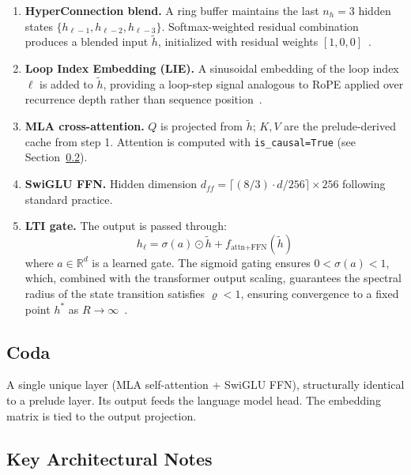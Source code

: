 \documentclass{article}
\begin{document}
\begin{enumerate}[leftmargin=*, topsep=2pt, itemsep=1pt]
  \item \textbf{HyperConnection blend.} A ring buffer maintains the last $n_h = 3$ hidden states $\{h_{\ell-1}, h_{\ell-2}, h_{\ell-3}\}$. Softmax-weighted residual combination produces a blended input $\tilde{h}$, initialized with residual weights $[1, 0, 0]$~\citep{zhang2024hyperconnections}.

  \item \textbf{Loop Index Embedding (LIE).} A sinusoidal embedding of the loop index $\ell$ is added to $\tilde{h}$, providing a loop-step signal analogous to RoPE applied over recurrence depth rather than sequence position~\citep{su2024roformer,gomez2026openmythos}.

  \item \textbf{MLA cross-attention.} $Q$ is projected from $\tilde{h}$; $K, V$ are the prelude-derived cache from step 1. Attention is computed with \texttt{is\_causal=True} (see Section~\ref{sec:arch_notes}).

  \item \textbf{SwiGLU FFN.} Hidden dimension $d_{ff} = \lceil (8/3) \cdot d / 256 \rceil \times 256$ following standard practice.

  \item \textbf{LTI gate.} The output is passed through:
  \[
    h_\ell = \sigma(a) \odot \tilde{h} + f_\text{attn+FFN}(\tilde{h})
  \]
  where $a \in \mathbb{R}^d$ is a learned gate. The sigmoid gating ensures $0 < \sigma(a) < 1$, which, combined with the transformer output scaling, guarantees the spectral radius of the state transition satisfies $\varrho < 1$, ensuring convergence to a fixed point $h^*$ as $R \to \infty$~\citep{prairie2026parcae,gomez2026openmythos}.
\end{enumerate}

\subsection{Coda}

A single unique layer (MLA self-attention + SwiGLU FFN), structurally identical to a prelude layer. Its output feeds the language model head. The embedding matrix is tied to the output projection.

\subsection{Key Architectural Notes}
\label{sec:arch_notes}
\end{document}
